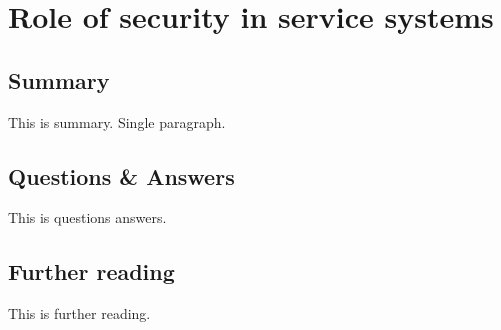 \section{Role of security in service systems}

\subsection{Summary}
This is summary. Single paragraph.

\subsection{Questions \& Answers}
This is questions answers.

\subsection{Further reading}
This is further reading.
